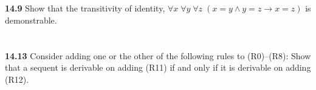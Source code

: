 \documentclass{ctexart}
\begin{document}
\section*{}
\textbf{14.9}
Show that the transitivity of identity, $\forall x\; \forall y\; \forall z\; (x = y \land y = z \to x = z)$ is
demonstrable.

\section*{}
\textbf{14.13}
Consider adding one or the other of the following rules to (R0)–(R8):
Show that a sequent is derivable on adding (R11) if and only if it is derivable
on adding (R12).
\end{document}
